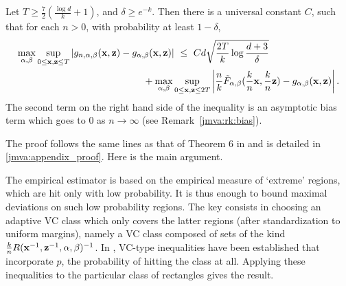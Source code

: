\begin{proposition}
\label{jmva:prop:g}
Let $T \ge \frac{7}{2}(\frac{\log d}{k} + 1)$, and $\delta \ge e^{-k}$.  %
Then there is a universal constant $C$, such that for each $n>0$, with probability at least $1 - \delta$,%
\begin{align}
\label{jmva:ineq:g}
\max_{\alpha, \beta} \sup_{ 0 \le \mathbf x, \mathbf z \le T } &\left| g_{n, \alpha, \beta}(\mathbf x, \mathbf z) - g_{\alpha, \beta}(\mathbf x, \mathbf z) \right| ~\le~  Cd\sqrt{\frac{2T}{k}\log\frac{d+3}{\delta}} 
\\\nonumber &~~~~~~~~~~~~~~~~~~~~~~~+ \max_{\alpha, \beta}  \sup_{0 \le \mathbf x, \mathbf z \le 2T}\left|\frac{n}{k} \tilde F_{\alpha, \beta}( \frac{k}{n} \mathbf x, \frac{k}{n} \mathbf z)- g_{\alpha, \beta}(\mathbf x, \mathbf z)\right|.
\end{align}
The second term on the right hand side of the inequality is an asymptotic bias term which goes to $0$ as $n \to \infty$ (see Remark~\ref{jmva:rk:bias}).
\end{proposition}
The proof follows the same lines as that of Theorem 6 in \cite{COLT15} and is detailed in \ref{jmva:appendix_proof}. Here is the main argument.

The empirical estimator is based on the empirical measure of `extreme' regions, which are hit only with  low probability. It is thus enough to bound maximal deviations on such low probability regions. The key consists in choosing an adaptive VC class which only covers the latter regions (after standardization to uniform margins), namely a VC class composed of sets of the kind $\frac{k}{n} R(\mathbf x^{-1}, \mathbf z^{-1}, \alpha, \beta)^{-1}$. In \cite{COLT15}, VC-type inequalities have been established that incorporate $p$, the probability of hitting the class at all. Applying these inequalities to the particular class of rectangles gives the result.

